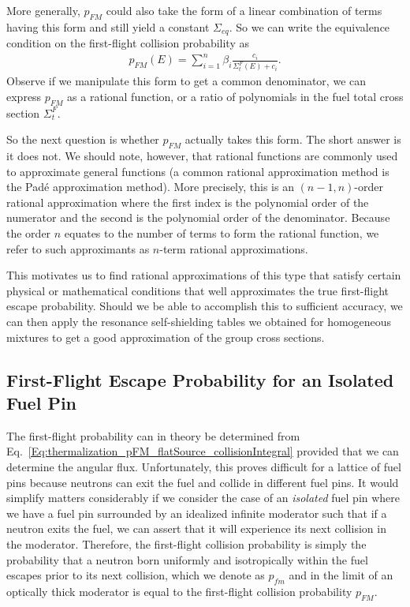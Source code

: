 More generally, $p_{FM}$ could also take the form of a linear combination of terms having this form and still yield a constant $\Sigma_{eq}$. So we can write the equivalence condition on the first-flight collision probability as
\begin{align}
  p_{FM}(E) = \sum_{i=1}^n \beta_i \frac{ c_i }{ \Sigma_t^F(E) + c_i } . \label{Eq:libraryGeneration_firstFlightCollisionProbability_nTermRationalForm}
\end{align}
Observe if we manipulate this form to get a common denominator, we can express $p_{FM}$ as a rational function, or a ratio of polynomials in the fuel total cross section $\Sigma_t^F$.

So the next question is whether $p_{FM}$ actually takes this form. The short answer is it does not. We should note, however, that rational functions are commonly used to approximate general functions (a common rational approximation method is the Pad\'{e} approximation method). More precisely, this is an $(n-1,n)$-order rational approximation where the first index is the polynomial order of the numerator and the second is the polynomial order of the denominator. Because the order $n$ equates to the number of terms to form the rational function, we refer to such approximants as $n$-term rational approximations.

This motivates us to find rational approximations of this type that satisfy certain physical or mathematical conditions that well approximates the true first-flight escape probability. Should we be able to accomplish this to sufficient accuracy, we can then apply the resonance self-shielding tables we obtained for homogeneous mixtures to get a good approximation of the group cross sections.




\subsection{First-Flight Escape Probability for an Isolated Fuel Pin}

The first-flight probability can in theory be determined from Eq.~\eqref{Eq:thermalization_pFM_flatSource_collisionIntegral} provided that we can determine the angular flux. Unfortunately, this proves difficult for a lattice of fuel pins because neutrons can exit the fuel and collide in different fuel pins. It would simplify matters considerably if we consider the case of an \emph{isolated} fuel pin where we have a fuel pin surrounded by an idealized infinite moderator such that if a neutron exits the fuel, we can assert that it will experience its next collision in the moderator. Therefore, the first-flight collision probability is simply the probability that a neutron born uniformly and isotropically within the fuel escapes prior to its next collision, which we denote as $p_{fm}$ and in the limit of an optically thick moderator is equal to the first-flight collision probability $p_{FM}$.

